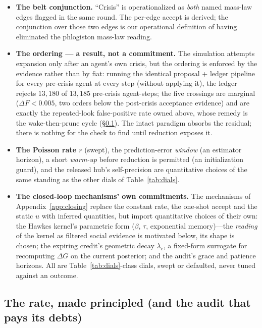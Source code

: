 \begin{itemize}
\item \textbf{The belt conjunction.} ``Crisis'' is operationalized as \emph{both} named
mass-law edges flagged in the same round. The per-edge accept is derived; the conjunction over
those two edges is our operational definition of having eliminated the phlogiston mass-law
reading.
\item \textbf{The ordering --- a result, not a commitment.} The simulation attempts expansion
only after an agent's own crisis, but the ordering is enforced by the evidence rather than by
fiat: running the identical proposal + ledger pipeline for every pre-crisis agent at every step
(without applying it), the ledger rejects $13{,}180$ of $13{,}185$ pre-crisis agent-steps; the
five crossings are marginal ($\Delta F < 0.005$, two orders below the post-crisis acceptance
evidence) and are exactly the repeated-look false-positive rate owned above, whose remedy is
the wake-then-prune cycle (\S\ref{app:exploration-future}). The intact paradigm absorbs the
residual; there is nothing for the check to find until reduction exposes it.
\item \textbf{The Poisson rate $r$} (swept), the prediction-error \emph{window} (an estimator
horizon), a short \emph{warm-up} before reduction is permitted (an initialization guard), and
the released hub's self-precision are quantitative choices of the same standing as the other
dials of Table~\ref{tab:dials}.
\item \textbf{The closed-loop mechanisms' own commitments.} The mechanisms of
Appendix~\ref{app:closing} replace the constant rate, the one-shot accept and the static $u$
with inferred quantities, but import quantitative choices of their own: the
Hawkes kernel's parametric form ($\beta$, $\tau$, exponential memory)---the \emph{reading} of
the kernel as filtered social evidence is motivated below, its shape is chosen; the expiring
credit's geometric decay $\lambda_c$, a fixed-form surrogate for recomputing $\Delta G$ on the
current posterior; and the audit's grace and patience horizons. All are
Table~\ref{tab:dials}-class dials, swept or defaulted, never tuned against an outcome.
\end{itemize}

\subsection{The rate, made principled (and the audit that pays its debts)}
\label{app:exploration-future}

